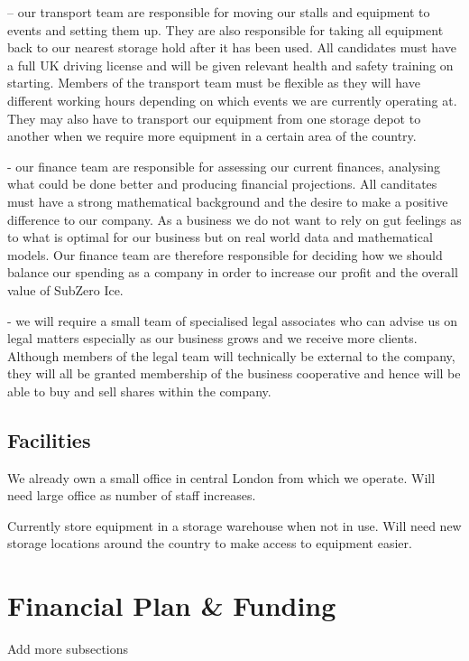 \documentclass{article}
\begin{document}
 – our transport team are responsible for moving our stalls and equipment to events and setting them up. They are also responsible for taking all equipment back to our nearest storage hold after it has been used. All candidates must have a full UK driving license and will be given relevant health and safety training on starting. Members of the transport team must be flexible as they will have different working hours depending on which events we are currently operating at. They may also have to transport our equipment from one storage depot to another when we require more equipment in a certain area of the country.

  - our finance team are responsible for assessing our current finances, analysing what could be done better and producing financial projections. All canditates must have a strong mathematical background and the desire to make a positive difference to our company. As a business we do not want to rely on gut feelings as to what is optimal for our business but on real world data and mathematical models. Our finance team are therefore responsible for deciding how we should balance our spending as a company in order to increase our profit and the overall value of SubZero Ice.

  - we will require a small team of specialised legal associates who can advise us on legal matters especially as our business grows and we receive more clients. Although members of the legal team will technically be external to the company, they will all be granted membership of the business cooperative and hence will be able to buy and sell shares within the company.


  \subsection{Facilities}

  We already own a small office in central London from which we operate.
  Will need large office as number of staff increases.

  Currently store equipment in a storage warehouse when not in use.
  Will need new storage locations around the country to make access to equipment easier.


\section{Financial Plan \& Funding}
Add more subsections
\end{document}
